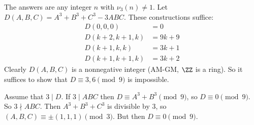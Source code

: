 The answers are any integer $n$ with $\boxed{\nu_3(n)\neq1}$. Let $D(A,B,C)=A^3+B^3+C^3-3ABC$. These constructions suffice:
\begin{align*}
	D(0,0,0) &= 0 \\
	D(k+2,k+1,k) &= 9k+9 \\
	D(k+1,k,k) &= 3k+1 \\
	D(k+1,k+1,k) &= 3k+2
\end{align*}
Clearly $D(A,B,C)$ is a nonnegative integer (AM-GM, $\ZZ$ is a ring). So it suffices to show that $D\equiv3,6\pmod9$ is impossible.

Assume that $3\mid D$. If $3\mid ABC$ then $D\equiv A^3+B^3\pmod9$, so $D\equiv0\pmod9$. So $3\nmid ABC$. Then $A^3+B^3+C^3$ is divisible by $3$, so $(A,B,C)\equiv\pm(1,1,1)\pmod3$. But then $D\equiv0\pmod9$.